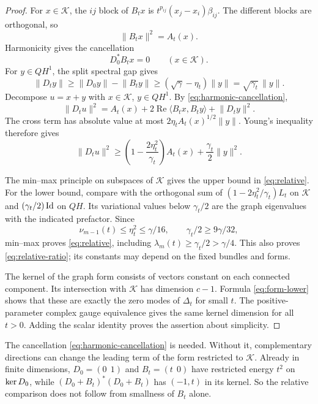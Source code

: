 \begin{proof}
For $x\in\mathcal K$, the $ij$ block of $B_tx$ is
$t^{p_{ij}}(x_j-x_i)\beta_{ij}$. The different blocks are orthogonal, so
\[
 \lVert B_tx\rVert^2=A_t(x).
\]
Harmonicity gives the cancellation
\begin{equation}\label{eq:harmonic-cancellation}
 D_0^*B_tx=0\qquad(x\in\mathcal K).
\end{equation}
For $y\in QH^1$, the split spectral gap gives
\begin{equation}\label{eq:complement-gap}
 \lVert D_ty\rVert\ge\lVert D_0y\rVert-\lVert B_ty\rVert
 \ge(\sqrt\gamma-\eta_t)\lVert y\rVert=\sqrt{\gamma_t}\,\lVert y\rVert.
\end{equation}
Decompose $u=x+y$ with $x\in\mathcal K$, $y\in QH^1$. By
\eqref{eq:harmonic-cancellation},
\[
 \lVert D_tu\rVert^2=A_t(x)
  +2\operatorname{Re}\langle B_tx,B_ty\rangle+\lVert D_ty\rVert^2.
\]
The cross term has absolute value at most
$2\eta_t A_t(x)^{1/2}\lVert y\rVert$. Young's inequality therefore gives
\begin{equation}\label{eq:form-lower}
 \lVert D_tu\rVert^2\ge
 \left(1-\frac{2\eta_t^2}{\gamma_t}\right)A_t(x)+\frac{\gamma_t}2\lVert y\rVert^2.
\end{equation}

The min--max principle on subspaces of $\mathcal K$ gives the upper
bound in \eqref{eq:relative}. For the lower bound, compare with the
orthogonal sum of $(1-2\eta_t^2/\gamma_t)L_t$ on $\mathcal K$ and
$(\gamma_t/2)\operatorname{Id}$ on $QH$. Its variational values below $\gamma_t/2$ are the graph
eigenvalues with the indicated prefactor. Since
\[
 \nu_{m-1}(t)\le\eta_t^2\le\gamma/16,
 \qquad \gamma_t/2\ge9\gamma/32,
\]
min--max proves \eqref{eq:relative}, including
$\lambda_m(t)\ge \gamma_t/2>\gamma/4$. This also proves
\eqref{eq:relative-ratio}; its constants may depend on the fixed bundles
and forms.

The kernel of the graph form consists of vectors constant on each
connected component. Its intersection with $\mathcal K$ has dimension
$c-1$. Formula \eqref{eq:form-lower} shows that these are exactly the
zero modes of $\Delta_t$ for small $t$. The positive-parameter complex
gauge equivalence gives the same kernel dimension for all $t>0$.
Adding the scalar identity proves the assertion about simplicity.
\end{proof}

\begin{remark}\label{rem:harmonicity-needed}
The cancellation \eqref{eq:harmonic-cancellation} is needed. Without it,
complementary directions can change the leading term of the form restricted
to $\mathcal K$. Already
in finite dimensions, $D_0=(0\ \ 1)$ and $B_t=(t\ \ 0)$ have restricted
energy $t^2$ on $\operatorname{ker} D_0$, while $(D_0+B_t)^*(D_0+B_t)$ has $(-1,t)$ in its
kernel. So the relative comparison does not follow from smallness of $B_t$
alone.
\end{remark}

